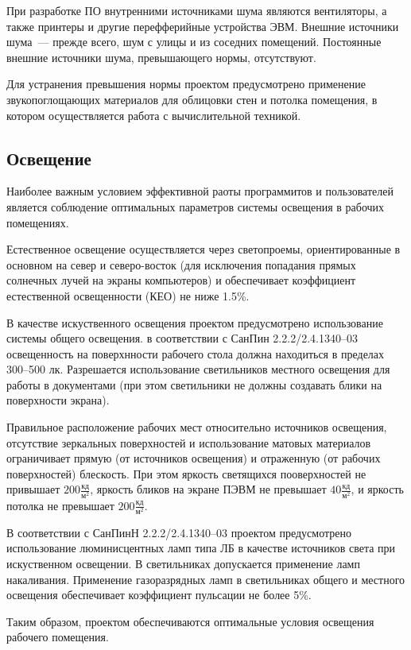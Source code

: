 При разработке ПО внутренними источниками шума являются вентиляторы, а также принтеры и другие перефферийные устройства ЭВМ. Внешние источники шума~--- прежде всего, шум с улицы и из соседних помещений. Постоянные внешние источники шума, превышающего нормы, отсутствуют.

Для устранения превышения нормы проектом предусмотрено применение звукопоглощающих материалов для облицовки стен и потолка помещения, в котором осуществляется работа с вычислительной техникой.

\subsection{Освещение}

Наиболее важным условием эффективной раоты программитов и пользователей является соблюдение оптимальных параметров системы освещения в рабочих помещениях.

Естественное освещение осуществляется через светопроемы, ориентированные в основном на север и северо-восток (для исключения попадания прямых солнечных лучей на экраны компьютеров) и обеспечивает коэффициент естественной освещенности (КЕО) не ниже 1.5\%.

В качестве искуственного освещения проектом предусмотрено использование системы общего освещения. в соответствии с СанПин 2.2.2/2.4.1340--03 освещенность на поверхнности рабочего стола должна находиться в пределах 300--500 лк. Разрешается использование светильников местного освещения для работы в документами (при этом светильники не должны создавать блики на поверхности экрана).

Правильное расположение рабочих мест относительно источников освещения, отсутствие зеркальных поверхностей и использование матовых материалов ограничивает прямую (от источников освещения) и отраженную (от рабочих поверхностей) блескость. При  этом яркость светящихся пооверхностей не привышает $200 \frac{\text{кд}}{\text{м}^2}$, яркость бликов на экране ПЭВМ не превышает $40 \frac{\text{кд}}{\text{м}^2}$, и яркость потолка не превышает $200 \frac{\text{кд}}{\text{м}^2}$.

В соответствии с СанПинН 2.2.2/2.4.1340--03 проектом предусмотрено использование люминисцентных ламп типа ЛБ в качестве источников света при искуственном освещении. В светильниках допускается применение ламп накаливания. Применение газоразрядных ламп в светильниках общего и местного освещения обеспечивает коэффициент пульсации не более 5\%.

Таким образом, проектом обеспечиваются оптимальные условия освещения рабочего помещения.

